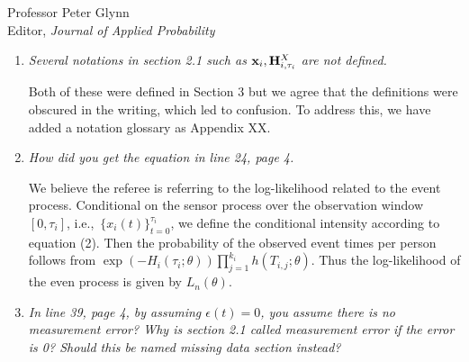 \documentclass[11pt]{letter} %
\begin{document}
\begin{letter}{Professor
	Peter Glynn\\
	Editor, {\em Journal of Applied Probability}}
\begin{enumerate}
\vspace{5mm}
We have now omitted this part from the current manuscript. The key issue we were trying to clarify is that the traditional joint model formulation in which the observed health process and time-to-event are conditionally independent given the latent process implies that the hazard function conditional on the entire observed health process depends on values after the current time.  In the case study, for example, this implies that the expected risk of a button press given the entire sensor process will depend on future activity index and electrodermal activity.  This holds unless we assume the measurement error is set to zero.  In this setting,~$\epsilon_i (t) = 0$ and so $\int_{t-\Delta}^t \epsilon_i (s) \beta(s)ds = 0$ by definition. While the author still thinks it an important point that he wishes was more well appreciated in the joint modeling literature, the current paper has enough content for this discussion to be omitted.  Moreover, the empirical impact seems to be limited and therefore it is better to make this point in a different manuscript and case study.
\vspace{5mm}

\item {\it Several notations in section 2.1 such as ${\bf x}_i, {\bf H}_{i,\tau_i}^X$ are not defined.}

\vspace{5mm}
Both of these were defined in Section 3 but we agree that the definitions were obscured in the writing, which led to confusion.  To address this, we have added a notation glossary as Appendix XX.
\vspace{5mm}

\item {\it How did you get the equation in line 24, page 4.}

\vspace{5mm}
We believe the referee is referring to the log-likelihood related to the event process.   Conditional on the sensor process over the observation window $[0,\tau_i]$, i.e.,~$\{ x_i (t) \}_{t=0}^{\tau_i}$, we define the conditional intensity according to equation (2).  Then the probability of the observed event times per person follows from $\exp \left( - H_i (\tau_i ; \theta) \right) \prod_{j=1}^{k_i} h \left(T_{i,j};\theta \right)$.  Thus the log-likelihood of the even process is given by $L_n (\theta)$.
\vspace{5mm}

\item {\it In line 39, page 4, by assuming $\epsilon(t) = 0$, you assume there is no measurement error? Why is section 2.1 called measurement error if the error is 0? Should this be named missing data section instead?}


\end{enumerate}
\end{letter}
\end{document}
